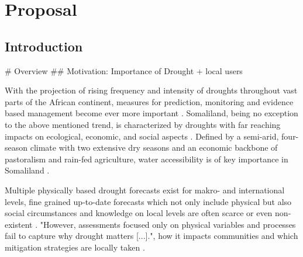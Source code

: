 
\chapter{Proposal} %

\label{Proposal} %

\newcommand{\keyword}[1]{\textbf{\#1}}
\newcommand{\tabhead}[1]{\textbf{\#1}}
\newcommand{\code}[1]{\texttt{\#1}}
\newcommand{\file}[1]{\texttt{\bfseries\#1}}
\newcommand{\option}[1]{\texttt{\itshape\#1}}


\section{Introduction}
\# Overview
\#\# Motivation: Importance of Drought + local users

With the projection of rising frequency and intensity of droughts throughout vast parts of the African continent, measures for prediction, monitoring and evidence based management become ever more important \autocite{abdulkadirAssessmentDroughtRecurrence2017,adelekanAfricaClimateChange2022,vereintenationenSpecialReportDrought2021}. Somaliland, being no exception to the above mentioned trend, is characterized by droughts with far reaching impacts on ecological, economic, and social aspects . Defined by a semi-arid, four-season climate with two extensive dry seasons and an economic backbone of pastoralism and rain-fed agriculture, water accessibility is of key importance in Somaliland \autocite{abdulkadirAssessmentDroughtRecurrence2017,petrucciLandscapeLandformsNorthern2022,republicofsomalilandSomalilandCountryProfile2021}. \newline

Multiple physically based drought forecasts exist for makro- and international levels, fine grained up-to-date forecasts which not only include physical but also social circumstances and knowledge on local levels are often scarce or even non-existent . "However, assessments focused only on physical variables and processes fail to capture why drought matters [...]."\autocite[3]{lackstromBackyardHydroclimatologyCitizen2022}, how it impacts communities and which mitigation strategies are locally taken .\newline

